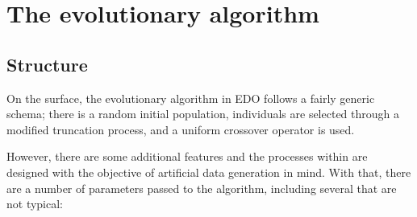 \section{The evolutionary algorithm}\label{section:algorithm}

\subsection{Structure}

On the surface, the evolutionary algorithm in EDO follows a fairly generic
schema; there is a random initial population, individuals are selected through a
modified truncation process, and a uniform crossover operator is used.

However, there are some additional features and the processes within are
designed with the objective of artificial data generation in mind. With that,
there are a number of parameters passed to the algorithm, including several that
are not typical:

